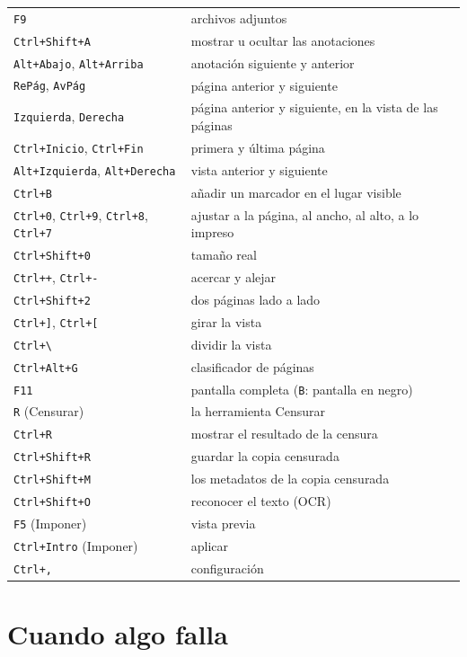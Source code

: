 \documentclass[12pt,
              article,
              oneside
              ]{memoir}
\newcommand*{\key}[1]{\texttt{#1}}
\begin{document}
\begin{longtable}{@{}>{\raggedright}p{}p{}@{}}
\key{F9} & archivos adjuntos\\
\key{Ctrl+Shift+A} & mostrar u ocultar las anotaciones\\
\key{Alt+Abajo}, \key{Alt+Arriba} & anotación siguiente y anterior\\
\key{RePág}, \key{AvPág} & página anterior y siguiente\\
\key{Izquierda}, \key{Derecha} & página anterior y siguiente, en la vista de las páginas\\
\key{Ctrl+Inicio}, \key{Ctrl+Fin} & primera y última página\\
\key{Alt+Izquierda}, \key{Alt+Derecha} & vista anterior y siguiente\\
\key{Ctrl+B} & añadir un marcador en el lugar visible\\
\key{Ctrl+0}, \key{Ctrl+9}, \key{Ctrl+8}, \key{Ctrl+7} & ajustar a la página, al ancho, al alto, a lo impreso\\
\key{Ctrl+Shift+0} & tamaño real\\
\key{Ctrl++}, \key{Ctrl+-} & acercar y alejar\\
\key{Ctrl+Shift+2} & dos páginas lado a lado\\
\key{Ctrl+]}, \key{Ctrl+[} & girar la vista\\
\key{Ctrl+\textbackslash} & dividir la vista\\
\key{Ctrl+Alt+G} & clasificador de páginas\\
\key{F11} & pantalla completa (\key{B}: pantalla en negro)\\
\key{R} (Censurar) & la herramienta Censurar\\
\key{Ctrl+R} & mostrar el resultado de la censura\\
\key{Ctrl+Shift+R} & guardar la copia censurada\\
\key{Ctrl+Shift+M} & los metadatos de la copia censurada\\
\key{Ctrl+Shift+O} & reconocer el texto (OCR)\\
\key{F5} (Imponer) & vista previa\\
\key{Ctrl+Intro} (Imponer) & aplicar\\
\key{Ctrl+,} & configuración\\
\bottomrule
\end{longtable}

\section{Cuando algo falla}
\end{document}
